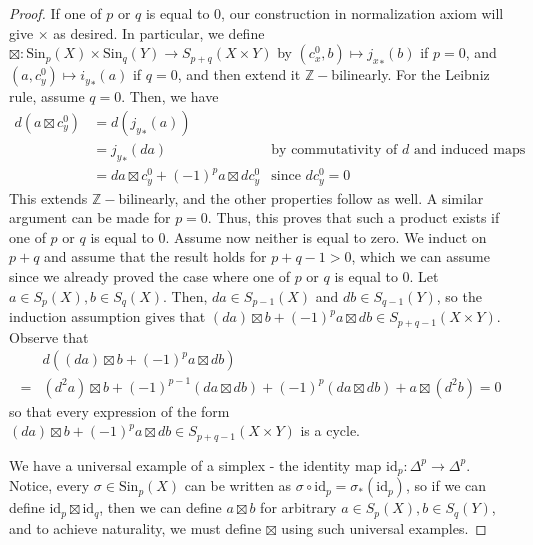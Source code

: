 \documentclass[12pt,reqno]{amsart}
\numberwithin{theorem}{section}
\theoremstyle{definition}
\theoremstyle{remark}
\numberwithin{equation}{section}
\newcommand{\Z}{\mathbb Z}
\theoremstyle{definition}
\newcommand{\id}{\mathrm{id}}
\newcommand{\Sin}{\mathrm{Sin}}
\begin{document}
\begin{proof}
If one of $p$ or $q$ is equal to $0$, our construction in normalization axiom will give $\times$ as desired. In particular, we define $\boxtimes : \Sin_{p}(X)\times \Sin_q(Y) \rightarrow S_{p+q}(X\times Y)$ by $(c_x^0,b) \mapsto {j_x}_*(b)$ if $p = 0$, and $(a,c_y^0) \mapsto {i_y}_*(a) $ if $q = 0$, and then extend it $\Z-$bilinearly. For the Leibniz rule, assume $q = 0$. Then, we have 
\begin{align*}
    d(a\boxtimes c_y^0) &=  d({j_y}_*( a)) \\
    &={j_y}_* (da) & \text{by commutativity of }d \text{ and induced maps} \\
    &= da \boxtimes c_y^0 + (-1)^p a \boxtimes dc_y^0 & \text{since }dc_y^0=0
\end{align*}
This extends $\Z-$bilinearly, and the other properties follow as well. A similar argument can be made for $p=0$. Thus, this proves that such a product exists if one of $p$ or $q$ is equal to $0$. Assume now neither is equal to zero. We induct on $p+q$ and assume that the result holds for $p+q-1 > 0$, which we can assume since we already proved the case where  one of $p$ or $q$ is equal to $0$. Let $a \in S_p(X),b \in S_q(X)$. Then, $da\in S_{p-1}(X)$ and $db \in S_{q-1}(Y)$, so the induction assumption gives that $(da)\boxtimes b +(-1)^pa\boxtimes db \in S_{p+q-1}(X\times Y)$.
Observe that 
\begin{align*}
    &d((da)\boxtimes b +(-1)^pa\boxtimes db) \\=& (d^2a)\boxtimes b +(-1)^{p-1}(da\boxtimes db) + (-1)^p(da \boxtimes db)+ a \boxtimes (d^2b) =0
\end{align*}
so that every expression of the form $(da)\boxtimes b +(-1)^pa\boxtimes db \in S_{p+q-1}(X\times Y)$ is a cycle. 

We have a universal example of a simplex - the identity map $\id_p : \Delta^p \rightarrow \Delta^p$. Notice, every $\sigma \in \Sin_p(X)$ can be written as $\sigma \circ \id_p =\sigma_*(\id_p)$, so if we can define $\id_p\boxtimes \id_q$, then we can define $a \boxtimes b$ for arbitrary $a \in S_p(X),b \in S_q(Y)$, and to achieve naturality, we must define $\boxtimes$ using such universal examples.


\end{proof}
\end{document}
